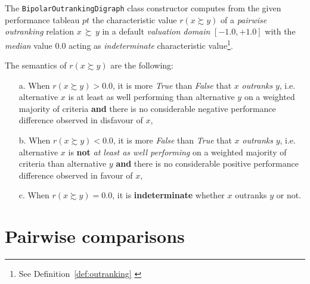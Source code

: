 The \texttt{BipolarOutrankingDigraph} class constructor computes from the given performance tableau $pt$ the characteristic value $r(x \succsim y)$ of a \emph{pairwise outranking} relation $x\, \succsim \,y$ in a default \emph{valuation domain} $[-1.0,+1.0]$ with the {\em median\/} value $0.0$ acting as \emph{indeterminate} characteristic value\footnote{See Definition~\ref{def:outranking} \citep{BIS-2013}}. 

\begin{definition} The semantics of $r(x \succsim y)$ are the following:
\begin{itemize}[nosep]
\item [a.] When $r(x \succsim y) > 0.0$, it is more {\em True\/} than {\em False\/} that $x$ \emph{outranks} $y$, i.e. alternative $x$ is at least as well performing than alternative $y$ on a weighted majority of criteria {\bf and} there is no considerable negative performance difference observed in disfavour of $x$,
\item [b.] When $r(x \succsim y) < 0.0$, it is more {\em False\/} than {\em True\/} that $x$ \emph{outranks} $y$, i.e. alternative $x$ is {\bf not} \emph{at least as well performing} on a weighted majority of criteria than alternative $y$ {\bf and} there is no considerable positive performance difference observed in favour of $x$,
\item [c.] When $r(x \succsim y) = 0.0$, it is {\bf indeterminate} whether $x$ outranks $y$ or not.
\end{itemize}
\end{definition}

\section{Pairwise comparisons}
\label{sec:3.3}

